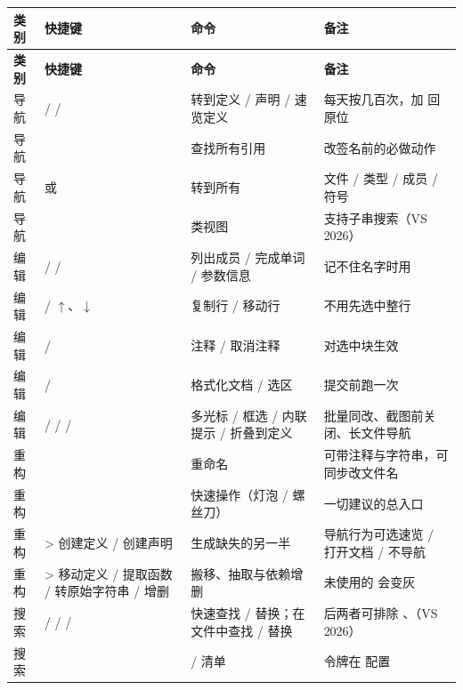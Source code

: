 \begin{longtable}{L{1.4cm}L{4.6cm}L{3.8cm}L{4.4cm}}\toprule
\textbf{类别} & \textbf{快捷键} & \textbf{命令} & \textbf{备注} \\ \midrule \endfirsthead
\toprule \textbf{类别} & \textbf{快捷键} & \textbf{命令} & \textbf{备注} \\ \midrule \endhead \bottomrule \endlastfoot
导航 &  /  /  & 转到定义 / 声明 / 速览定义 & 每天按几百次，加  回原位 \\
导航 &  & 查找所有引用 & 改签名前的必做动作 \\
导航 &  或  & 转到所有 & 文件 / 类型 / 成员 / 符号 \\
导航 &  & 类视图 & 支持子串搜索（VS 2026） \\
编辑 &  /  /  & 列出成员 / 完成单词 / 参数信息 & 记不住名字时用  \\
编辑 &  / $\uparrow$、$\downarrow$ & 复制行 / 移动行 & 不用先选中整行 \\
编辑 &  /  & 注释 / 取消注释 & 对选中块生效 \\
编辑 &  /  & 格式化文档 / 选区 & 提交前跑一次 \\
编辑 &  /  /  /  & 多光标 / 框选 / 内联提示 / 折叠到定义 & 批量同改、截图前关闭、长文件导航 \\
重构 &  & 重命名 & 可带注释与字符串，可同步改文件名 \\
重构 &  & 快速操作（灯泡 / 螺丝刀） & 一切建议的总入口 \\
重构 &  > 创建定义 / 创建声明 & 生成缺失的另一半 & 导航行为可选速览 / 打开文档 / 不导航 \\
重构 &  > 移动定义 / 提取函数 / 转原始字符串 / 增删  & 搬移、抽取与依赖增删 & 未使用的  会变灰 \\
搜索 &  /  /  /  & 快速查找 / 替换；在文件中查找 / 替换 & 后两者可排除 、（VS 2026） \\
搜索 &  &  /  清单 & 令牌在  配置 \\
\end{longtable}
